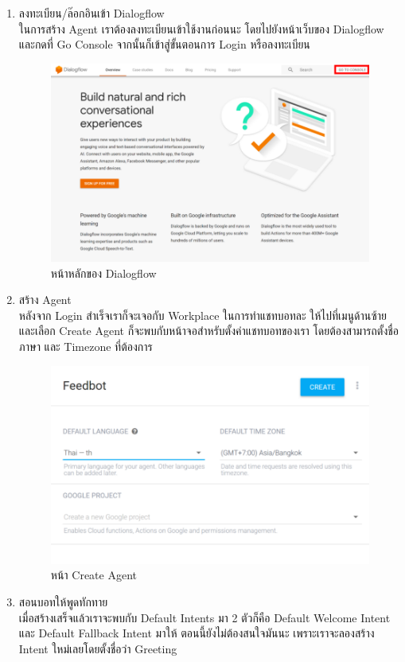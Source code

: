 \begin{enumerate}
	\item ลงทะเบียน/ล๊อกอินเข้า Dialogflow \\
	ในการสร้าง Agent เราต้องลงทะเบียนเข้าใช้งานก่อนนะ โดยไปยังหน้าเว็บของ Dialogflow และกดที่ Go Console จากนั้นก็เข้าสู่ขั้นตอนการ Login หรือลงทะเบียน

	\begin{figure}[H]
		\centering
		\includegraphics[width=0.7\columnwidth]{Figures/2/dialogflow_1}
		\caption{หน้าหลักของ Dialogflow}
		\label{Fig:dialogflow1}
	\end{figure}

	\item สร้าง Agent \\
	หลังจาก Login สำเร็จเราก็จะเจอกับ Workplace ในการทำแชทบอทละ ให้ไปที่เมนูด้านซ้าย และเลือก Create Agent ก็จะพบกับหน้าจอสำหรับตั้งค่าแชทบอทของเรา โดยต้องสามารถตั้งชื่อ ภาษา และ Timezone ที่ต้องการ

	\begin{figure}[H]
		\centering
		\includegraphics[width=0.7\columnwidth]{Figures/2/dialogflow_2}
		\caption{หน้า Create Agent}
		\label{Fig:dialogflow2}
	\end{figure}

	\item สอนบอทให้พูดทักทาย \\
	เมื่อสร้างเสร็จแล้วเราจะพบกับ Default Intents มา 2 ตัวก็คือ Default Welcome Intent และ Default Fallback Intent มาให้ ตอนนี้ยังไม่ต้องสนใจมันนะ เพราะเราจะลองสร้าง Intent ใหม่เลยโดยตั้งชื่อว่า Greeting


\end{enumerate}
